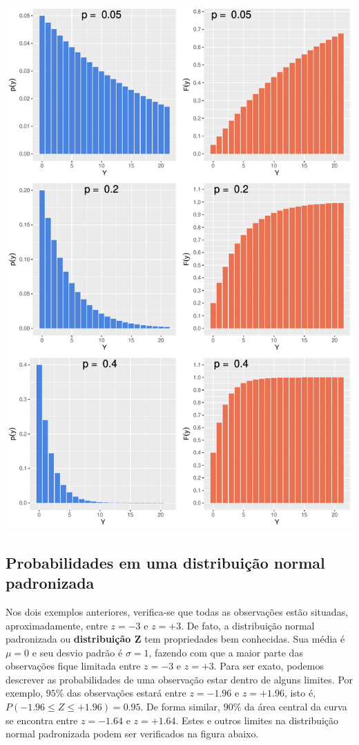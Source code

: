 \documentclass[
]{book}
\begin{document}
\begin{center}\includegraphics{probest-cambientais_files/figure-latex/unnamed-chunk-199-1} \end{center}

\hypertarget{probabilidades-em-uma-distribuiuxe7uxe3o-normal-padronizada}{%
\subsection{Probabilidades em uma distribuição normal padronizada}\label{probabilidades-em-uma-distribuiuxe7uxe3o-normal-padronizada}}

Nos dois exemplos anteriores, verifica-se que todas as observações estão situadas, aproximadamente, entre \(z = -3\) e \(z = +3\). De fato, a distribuição normal padronizada ou \textbf{distribuição Z} tem propriedades bem conhecidas. Sua média é \(\mu = 0\) e seu desvio padrão é \(\sigma = 1\), fazendo com que a maior parte das observações fique limitada entre \(z = -3\) e \(z = +3\). Para ser exato, podemos descrever as probabilidades de uma observação estar dentro de alguns limites. Por exemplo, \(95\%\) das observações estará entre \(z = -1.96\) e \(z = +1.96\), isto é, \(P(-1.96 \le Z \le +1.96) = 0.95\). De forma similar, \(90\%\) da área central da curva se encontra entre \(z = -1.64\) e \(z = +1.64\). Estes e outros limites na distribuição normal padronizada podem ser verificados na figura abaixo.
\end{document}
